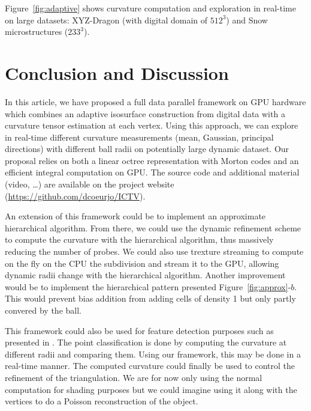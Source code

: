 \documentclass{llncs}
\begin{document}
Figure~\ref{fig:adaptive} shows curvature computation and exploration in
real-time on large datasets: XYZ-Dragon (with digital domain of $512^3$) and
Snow microstructures ($233^3$).

\section{Conclusion and Discussion}
\label{sec:discussion}

In this article, we have proposed a full data parallel framework on GPU
hardware which combines an adaptive isosurface construction from
digital data with a curvature tensor estimation at each vertex. Using
this approach, we can explore in real-time different curvature
measurements (mean, Gaussian, principal directions) with different
ball radii on potentially large dynamic dataset. Our proposal relies
on both a linear octree representation with Morton codes and an
efficient integral computation on GPU. The source code and additional
material (video, \ldots) are available on the project website
(\url{https://github.com/dcoeurjo/ICTV}).

An extension of this framework could be to implement an approximate hierarchical
algorithm. From there, we could use the dynamic refinement scheme to compute
the curvature with the hierarchical algorithm, thus massively reducing the number of probes.
We could also use trexture streaming to compute on the fly on the CPU the subdivision and
stream it to the GPU, allowing dynamic radii change with the hierarchical algorithm.
Another improvement would be to implement the hierarchical pattern presented Figure~\ref{fig:approx}-$b$.
This would prevent bias addition from adding cells of density 1 but only partly convered by the ball.

This framework could also be used for feature detection purposes
such as presented in \cite{SMI2015}. The point classification is done by computing
the curvature at different radii and comparing them. Using our framework,
this may be done in a real-time manner.
The computed curvature could finally be used to control the refinement of the
triangulation. We are for now only using the normal computation for shading
purposes but we could imagine using it along with the vertices to do a
Poisson reconstruction of the object.

\end{document}

